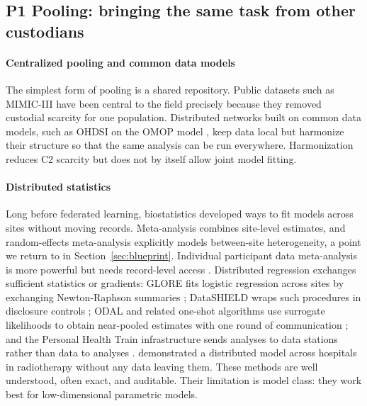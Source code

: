 \documentclass[acmsmall,screen,review]{acmart}
\theoremstyle{acmdefinition}
\begin{document}
\subsection{P1 Pooling: bringing the same task from other custodians}\label{sec:S6_1}

\paragraph{Centralized pooling and common data models} The simplest form of pooling is a shared repository. Public datasets such as MIMIC-III \cite{johnson2016mimic} have been central to the field precisely because they removed custodial scarcity for one population. Distributed networks built on common data models, such as OHDSI on the OMOP model \cite{hripcsak2015observational,overhage2012validation}, keep data local but harmonize their structure so that the same analysis can be run everywhere. Harmonization reduces C2 scarcity but does not by itself allow joint model fitting.

\paragraph{Distributed statistics} Long before federated learning, biostatistics developed ways to fit models across sites without moving records. Meta-analysis combines site-level estimates, and random-effects meta-analysis \cite{dersimonian1986meta} explicitly models between-site heterogeneity, a point we return to in Section~\ref{sec:blueprint}. Individual participant data meta-analysis is more powerful but needs record-level access \cite{riley2010meta}. Distributed regression exchanges sufficient statistics or gradients: GLORE fits logistic regression across sites by exchanging Newton-Raphson summaries \cite{wu2012grid}; DataSHIELD wraps such procedures in disclosure controls \cite{gaye2014datashield}; ODAL and related one-shot algorithms use surrogate likelihoods to obtain near-pooled estimates with one round of communication \cite{duan2020learning,jordan2019communication}; and the Personal Health Train infrastructure sends analyses to data stations rather than data to analyses \cite{beyan2020distributed}. \citet{jochems2016distributed} demonstrated a distributed model across hospitals in radiotherapy without any data leaving them. These methods are well understood, often exact, and auditable. Their limitation is model class: they work best for low-dimensional parametric models.
\end{document}

